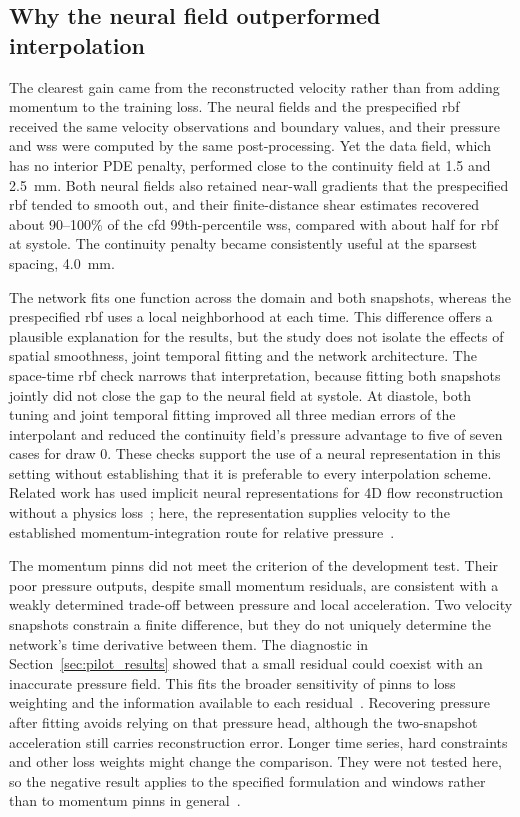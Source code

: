 \documentclass[12pt,a4paper]{article}
\newcommand{\CFD}{\ac{cfd}\xspace}
\newcommand{\PINNs}{\acp{pinn}\xspace}
\newcommand{\WSS}{\ac{wss}\xspace}
\newcommand{\RBF}{\ac{rbf}\xspace}
\theoremstyle{definition}
\numberwithin{equation}{section}
\begin{document}
\subsection{Why the neural field outperformed interpolation}
The clearest gain came from the reconstructed velocity rather than from adding momentum to the training loss. The neural fields and the prespecified \RBF received the same velocity observations and boundary values, and their pressure and \WSS were computed by the same post-processing. Yet the data field, which has no interior PDE penalty, performed close to the continuity field at 1.5 and 2.5~mm. Both neural fields also retained near-wall gradients that the prespecified \RBF tended to smooth out, and their finite-distance shear estimates recovered about 90--100\% of the \CFD 99th-percentile \WSS, compared with about half for \RBF at systole. The continuity penalty became consistently useful at the sparsest spacing, 4.0~mm.

The network fits one function across the domain and both snapshots, whereas the prespecified \RBF uses a local neighborhood at each time. This difference offers a plausible explanation for the results, but the study does not isolate the effects of spatial smoothness, joint temporal fitting and the network architecture. The space-time \RBF check narrows that interpretation, because fitting both snapshots jointly did not close the gap to the neural field at systole. At diastole, both tuning and joint temporal fitting improved all three median errors of the interpolant and reduced the continuity field's pressure advantage to five of seven cases for draw 0. These checks support the use of a neural representation in this setting without establishing that it is preferable to every interpolation scheme. Related work has used implicit neural representations for 4D flow reconstruction without a physics loss~\cite{saitta2024implicit}; here, the representation supplies velocity to the established momentum-integration route for relative pressure~\cite{krittian2012finite,bertoglio2018relative}.

The momentum \PINNs did not meet the criterion of the development test. Their poor pressure outputs, despite small momentum residuals, are consistent with a weakly determined trade-off between pressure and local acceleration. Two velocity snapshots constrain a finite difference, but they do not uniquely determine the network's time derivative between them. The diagnostic in Section~\ref{sec:pilot_results} showed that a small residual could coexist with an inaccurate pressure field. This fits the broader sensitivity of \PINNs to loss weighting and the information available to each residual~\cite{krishnapriyan2021failure,wang2021gradient}. Recovering pressure after fitting avoids relying on that pressure head, although the two-snapshot acceleration still carries reconstruction error. Longer time series, hard constraints and other loss weights might change the comparison. They were not tested here, so the negative result applies to the specified formulation and windows rather than to momentum \PINNs in general~\cite{mcgreivy2024weak}.
\end{document}
